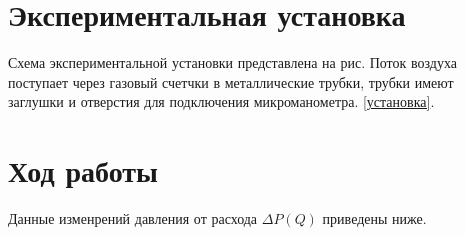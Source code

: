 \documentclass[a4paper,12pt]{article} %
\begin{document}
\section*{Экспериментальная установка}
Схема экспериментальной установки представлена на рис. Поток воздуха поступает через газовый счетчки в металлические трубки, трубки имеют заглушки и отверстия для подключения микроманометра.  \ref{установка}. 

\section*{Ход работы}

Данные изменрений давления от расхода $\Delta P (Q)$ приведены ниже. 

\end{document}
